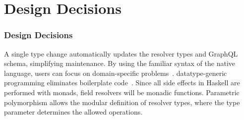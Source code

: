 
\section{Design Decisions} 

\begin{frame}\frametitle{Design Decisions}

\begin{itemize}
     A single type change automatically updates the resolver types and GraphQL schema, simplifying maintenance. 
     By using the familiar syntax of the native language, users can focus on domain-specific problems~\cite{edsl-modeling}.
    datatype-generic programming eliminates boilerplate code~\cite{scrap-your-boilerplate}.
     Since all side effects in Haskell are performed with monads, field resolvers will be monadic functions. 
     Parametric polymorphism allows the modular definition of resolver types, where the type parameter determines the allowed operations.
\end{itemize}
\end{frame}